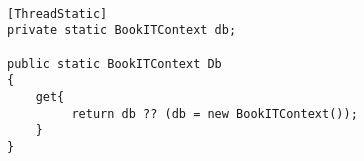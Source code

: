 \begin{lstlisting}[caption=Trådsikkerhed i tilgang til databasen, label=Code-ThreadStatic]

[ThreadStatic]
private static BookITContext db;

public static BookITContext Db
{
    get{
         return db ?? (db = new BookITContext());
    }
}
\end{lstlisting}